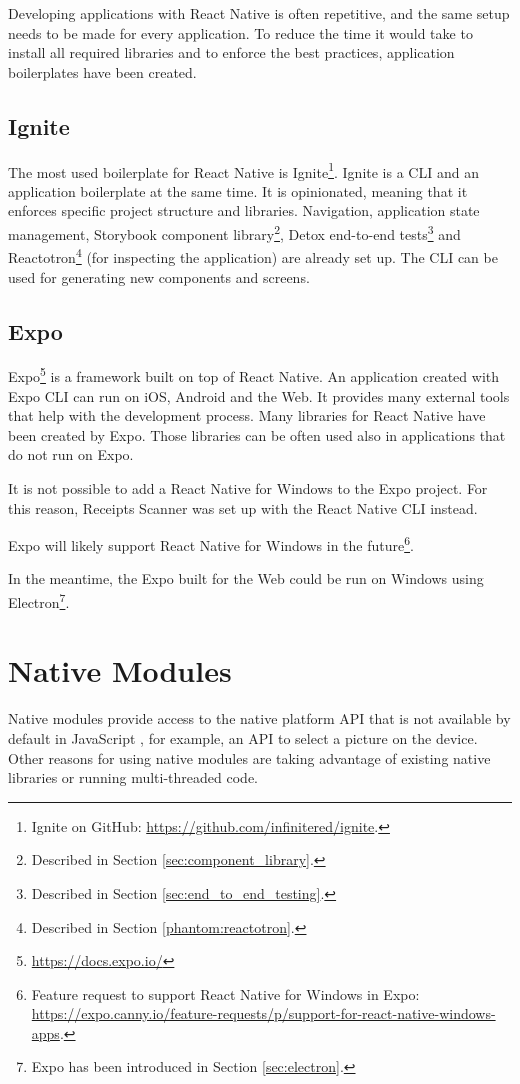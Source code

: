 \documentclass[
  digital, %
  table,   %
  oneside, %
  lof,     %
  lot,     %
]{fithesis3}
\begin{document}
Developing applications with React Native is often repetitive, and the same setup needs to be made for every application. To reduce the time it would take to install all required libraries and to enforce the best practices, application boilerplates have been created.

\subsection{Ignite}
The most used boilerplate for React Native is Ignite\footnote{Ignite on GitHub: \url{https://github.com/infinitered/ignite}.}.
Ignite is a CLI and an application boilerplate at the same time. It is opinionated, meaning that it enforces specific project structure and libraries. Navigation, application state management, Storybook component library\footnote{Described in Section \ref{sec:component_library}.}, Detox end-to-end tests\footnote{Described in Section \ref{sec:end_to_end_testing}.} and Reactotron\footnote{Described in Section \ref{phantom:reactotron}.} (for inspecting the application) are already set up. The CLI can be used for generating new components and screens.

\subsection{Expo}
\label{sec:expo}
Expo\footnote{\url{https://docs.expo.io/}} is a framework built on top of React Native. An application created with Expo CLI can run on iOS, Android and the Web. It provides many external tools that help with the development process. 
Many libraries for React Native have been created by Expo. Those libraries can be often used also in applications that do not run on Expo.

It is not possible to add a React Native for Windows to the Expo project. For this reason, Receipts Scanner was set up with the React Native CLI instead.

Expo will likely support React Native for Windows in the future\footnote{Feature request to support React Native for Windows in Expo: \url{https://expo.canny.io/feature-requests/p/support-for-react-native-windows-apps}.}.

In the meantime, the Expo built for the Web could be run on Windows using Electron\footnote{Expo has been introduced in Section \ref{sec:electron}.}.

\section{Native Modules}
Native modules provide access to the native platform API that is not available by default in JavaScript \cite{RNNativeModulesIntro}, for example, an API to select a picture on the device. Other reasons for using native modules are taking advantage of existing native libraries or running multi-threaded code.
\end{document}

